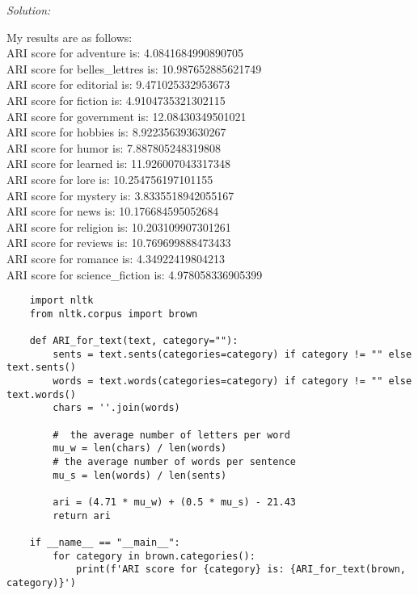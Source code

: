 \documentclass[11pt]{article}
\newenvironment{solution}{
	\vspace{10px}\noindent\emph{Solution:}
}{
	\vspace{10px}
}
\begin{document}
\begin{solution}
	
	My results are as follows: 
	\\ \indent ARI score for adventure is: 4.0841684990890705
	\\ \indent ARI score for belles\_lettres is: 10.987652885621749
	\\ \indent ARI score for editorial is: 9.471025332953673
	\\ \indent ARI score for fiction is: 4.9104735321302115
	\\ \indent ARI score for government is: 12.08430349501021
	\\ \indent ARI score for hobbies is: 8.922356393630267
	\\ \indent ARI score for humor is: 7.887805248319808
	\\ \indent ARI score for learned is: 11.926007043317348
	\\ \indent ARI score for lore is: 10.254756197101155
	\\ \indent ARI score for mystery is: 3.8335518942055167
	\\ \indent ARI score for news is: 10.176684595052684
	\\ \indent ARI score for religion is: 10.203109907301261
	\\ \indent ARI score for reviews is: 10.769699888473433
	\\ \indent ARI score for romance is: 4.34922419804213
	\\ \indent ARI score for science\_fiction is: 4.978058336905399
	
	\begin{lstlisting}
	import nltk 
	from nltk.corpus import brown
	
	def ARI_for_text(text, category=""): 
		sents = text.sents(categories=category) if category != "" else text.sents()
		words = text.words(categories=category) if category != "" else text.words()
		chars = ''.join(words)
		
		#  the average number of letters per word 
		mu_w = len(chars) / len(words)
		# the average number of words per sentence
		mu_s = len(words) / len(sents)
		
		ari = (4.71 * mu_w) + (0.5 * mu_s) - 21.43
		return ari
	
	if __name__ == "__main__":
		for category in brown.categories(): 
			print(f'ARI score for {category} is: {ARI_for_text(brown, category)}')
	\end{lstlisting}
	
\end{solution} 
\end{document}
